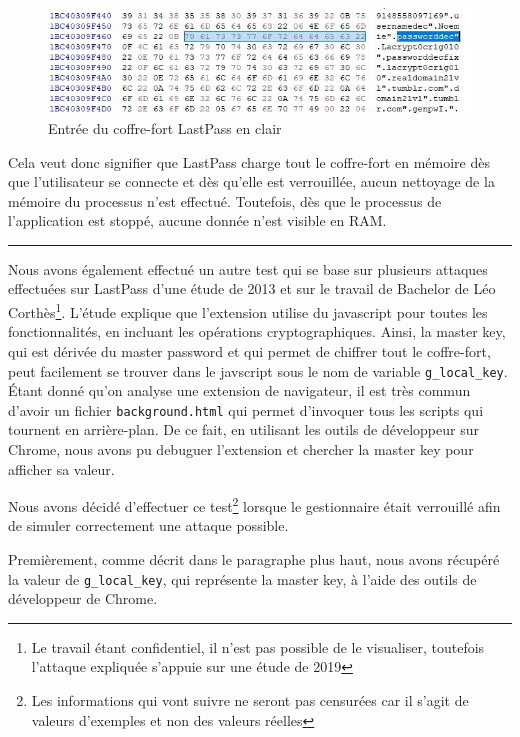 \begin{figure}[H]
	\centering
	\includegraphics[width=15.5cm]{images/lp_pass.jpg}
	\caption{Entrée du coffre-fort LastPass en clair}
\end{figure} 

Cela veut donc signifier que LastPass charge tout le coffre-fort en mémoire dès que l'utilisateur se connecte et dès qu'elle est verrouillée, aucun nettoyage de la mémoire du processus n'est effectué. Toutefois, dès que le processus de l'application est stoppé, aucune donnée n'est visible en RAM.

\par\noindent\rule{\textwidth}{0.4pt}

Nous avons également effectué un autre test qui se base sur plusieurs attaques effectuées sur LastPass d'une étude de 2013\cite{zhao} et sur le travail de Bachelor de Léo Corthès\cite{leo}\footnote{Le travail étant confidentiel, il n'est pas possible de le visualiser, toutefois l'attaque expliquée s'appuie sur une étude de 2019\cite{p59}}. L'étude explique que l'extension utilise du javascript pour toutes les fonctionnalités, en incluant les opérations cryptographiques. Ainsi, la master key, qui est dérivée du master password et qui permet de chiffrer tout le coffre-fort, peut facilement se trouver dans le javscript sous le nom de variable  \verb|g_local_key|. Étant donné qu'on analyse une extension de navigateur, il est très commun d'avoir un fichier \verb|background.html| qui permet d'invoquer tous les scripts qui tournent en arrière-plan. De ce fait, en utilisant les outils de développeur sur Chrome, nous avons pu debuguer l'extension et chercher la master key pour afficher sa valeur. 

Nous avons décidé d'effectuer ce test\footnote{Les informations qui vont suivre ne seront pas censurées car il s'agit de valeurs d'exemples et non des valeurs réelles} lorsque le gestionnaire était verrouillé afin de simuler correctement une attaque possible. 

Premièrement, comme décrit dans le paragraphe plus haut, nous avons récupéré la valeur de \verb|g_local_key|, qui représente la master key, à l'aide des outils de développeur de Chrome.

